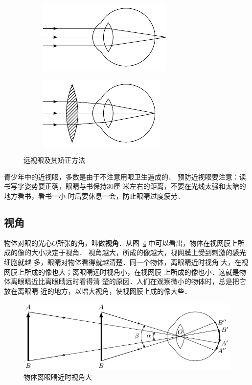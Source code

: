 \begin{figure}[htbp]
    \centering
    \begin{subfigure}{0.4\linewidth}
        \centering
        \includegraphics{fig/C/5-51a.pdf}
        \caption{}\label{fig_C_5-51a}
    \end{subfigure}
    \hfil
    \begin{subfigure}{0.4\linewidth}
        \centering
        \includegraphics{fig/C/5-51b.pdf}
        \caption{}\label{fig_C_5-51b}
    \end{subfigure}
    \caption{远视眼及其矫正方法}\label{fig_C_5-51}
\end{figure}

青少年中的近视眼，多数是由于不注意用眼卫生造成的．
预防近视眼要注意：读书写字姿势要正确，眼睛与书保持30厘
米左右的距离，不要在光线太强和太暗的地方看书，看书一小
时后要休息一会，防止眼睛过度疲劳．

\subsection{视角}

物体对眼的光心$O$所张的角，叫做\textbf{视角}．从图~\ref{fig_C_5-52} 中可以看出，物体在视网膜上所成的像的大小决定于视角．
视角越大，所成的像越大，视网膜上受到刺激的感光细胞就越
多，眼睛对物体看得就越清楚．同一个物体，离眼睛近时视角
大，在视网膜上所成的像也大；离眼睛远时视角小，在视网膜
上所成的像也小．这就是物体离眼睛近比离眼睛远时看得清
楚的原因．人们在观察微小的物体时，总是把它放在离眼睛
近的地方，以增大视角，使视网膜上成的像大些．

\begin{figure}[htbp]
    \centering
    \includegraphics{fig/C/5-52.pdf}
    \caption{物体离眼睛近时视角大}\label{fig_C_5-52}
\end{figure}

